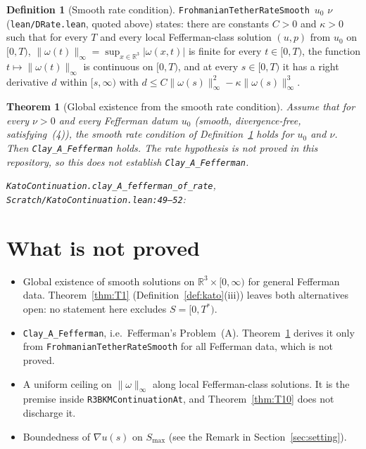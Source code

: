 \documentclass[11pt]{article}
\newcommand{\R}{\mathbb{R}}
\newcommand{\lean}[1]{\texttt{#1}}
\newtheorem{theorem}{Theorem}
\theoremstyle{definition}
\newtheorem{definition}{Definition}
\theoremstyle{remark}
\begin{document}
\begin{definition}[Smooth rate condition]\label{def:rate} \lean{FrohmanianTetherRateSmooth}\ $u_0$ $\nu$ (\lean{lean/DRate.lean}, quoted above) states: there are constants $C>0$ and $\kappa>0$ such that for every $T$ and every local Fefferman-class solution $(u,p)$ from $u_0$ on $[0,T)$, $\|\omega(t)\|_\infty=\sup_{x\in\R^3}|\omega(x,t)|$ is finite for every $t\in[0,T)$, the function $t\mapsto\|\omega(t)\|_\infty$ is continuous on $[0,T)$, and at every $s\in[0,T)$ it has a right derivative $d$ within $[s,\infty)$ with $d\le C\|\omega(s)\|_\infty^2-\kappa\|\omega(s)\|_\infty^3$.
\end{definition}

\begin{theorem}[Global existence from the smooth rate condition]
\label{thm:T11}
Assume that for every $\nu>0$ and every Fefferman datum $u_0$ (smooth, divergence-free, satisfying~(4)), the smooth rate condition of Definition~\ref{def:rate} holds for $u_0$ and $\nu$. Then \lean{Clay\_A\_Fefferman} holds. The rate hypothesis is not proved in this repository, so this does not establish \lean{Clay\_A\_Fefferman}.

\noindent\lean{KatoContinuation.clay\_A\_fefferman\_of\_rate}, \lean{Scratch/KatoContinuation.lean:49--52}:
\end{theorem}

\section{What is not proved}
\label{sec:notproved}
\begin{itemize}[leftmargin=*]
\item Global existence of smooth solutions on $\R^3\times[0,\infty)$ for general Fefferman data. Theorem~\ref{thm:T1} (Definition~\ref{def:kato}(iii)) leaves both alternatives open: no statement here excludes $S=[0,T^*)$.
\item \lean{Clay\_A\_Fefferman}, i.e.\ Fefferman's Problem~(A). Theorem~\ref{thm:T11} derives it only from \lean{FrohmanianTetherRateSmooth} for all Fefferman data, which is not proved.
\item A uniform ceiling on $\|\omega\|_\infty$ along local Fefferman-class solutions. It is the premise inside \lean{R3BKMContinuationAt}, and Theorem~\ref{thm:T10} does not discharge it.
\item Boundedness of $\nabla u(s)$ on $S_{\max}$ (see the Remark in Section~\ref{sec:setting}).
\end{itemize}
\end{document}
